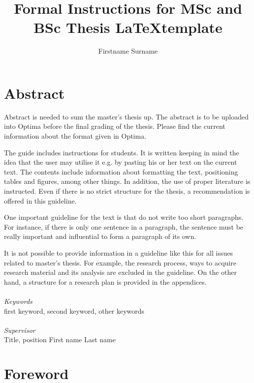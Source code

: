 \documentclass[a4paper,12pt]{article}
\author{Firstname Surname}
\title{Formal Instructions for MSc and BSc Thesis \LaTeX \space template}
\begin{document}
\maketitle

\setcounter{page}{2}

\section*{Abstract}
Abstract is needed to sum the master’s thesis up. The abstract is to be uploaded into Optima before the final grading of the thesis. Please find the current information about the format given in Optima.

The guide includes instructions for students. It is written keeping in mind the idea that the user may utilise it e.g. by pasting his or her text on the current text. The contents include information about formatting the text, positioning tables and figures, among other things. In addition, the use of proper literature is instructed. Even if there is no strict structure for the thesis, a recommendation is offered in this guideline.

One important guideline for the text is that do not write too short paragraphs. For instance, if there is only one sentence in a paragraph, the sentence must be really important and influential to form a paragraph of its own.

It is not possible to provide information in a guideline like this for all issues related to master’s thesis. For example, the research process, ways to acquire research material and its analysis are excluded in the guideline. On the other hand, a structure for a research plan is provided in the appendices.
\\
\\
{\sffamily\itshape Keywords}\\
first keyword, second keyword, other keywords
\\
\\
{\sffamily\itshape Supervisor}\\
Title, position First name Last name

\newpage
\section*{Foreword}
\end{document}
